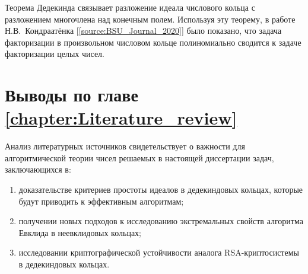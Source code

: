 \documentclass[_00_dissertation.tex]{subfiles}
\begin{document}
Теорема Дедекинда связывает разложение идеала числового кольца с разложением многочлена над конечным полем.
Используя эту теорему, в работе Н.В.~Кондраатёнка [\ref{source:BSU_Journal_2020}] было показано, что задача факторизации в произвольном числовом кольце полиномиально сводится к задаче факторизации целых чисел.

\section*{Выводы по главе \ref{chapter:Literature_review}}

Анализ литературных источников свидетельствует о важности для алгоритмической теории чисел решаемых в настоящей диссертации задач, заключающихся в:
\begin{enumerate}
    \item доказательстве критериев простоты идеалов в дедекиндовых кольцах, которые будут приводить к эффективным алгоритмам;

    \item получении новых подходов к исследованию экстремальных свойств алгоритма Евклида в неевклидовых кольцах;

    \item исследовании криптографической устойчивости аналога RSA-криптосистемы в дедекиндовых кольцах.
\end{enumerate}

\onlyinsubfile{
    
}
\end{document}
